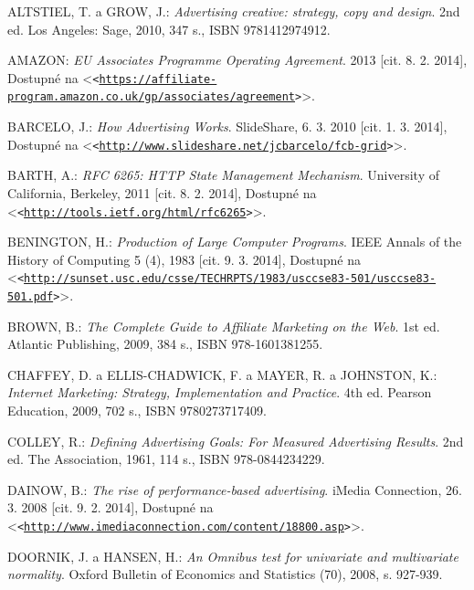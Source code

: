 \documentclass[12pt,twoside,openany]{fithesis}
\let\origurl\url
\def\url#1{\texttt{<\origurl{#1}>}}
\begin{document}

\begin{thebibliography}{99}



ALTSTIEL, T. a GROW, J.: \emph{Advertising creative: strategy, copy and design}. 2nd ed. Los Angeles: Sage, 2010, 347 s., ISBN 9781412974912.

AMAZON: \emph{EU Associates Programme Operating Agreement}. 2013 [cit. 8. 2. 2014], Dostupné na {\textless}\url{https://affiliate-program.amazon.co.uk/gp/associates/agreement}{\textgreater}.

BARCELO, J.: \emph{How Advertising Works}. SlideShare, 6. 3. 2010 [cit. 1. 3. 2014], Dostupné na {\textless}\url{http://www.slideshare.net/jcbarcelo/fcb-grid}{\textgreater}.

BARTH, A.: \emph{RFC 6265: HTTP State Management Mechanism}. University of California, Berkeley, 2011 [cit. 8. 2. 2014], Dostupné na {\textless}\url{http://tools.ietf.org/html/rfc6265}{\textgreater}.

BENINGTON, H.: \emph{Production of Large Computer Programs}. IEEE Annals of the History of Computing 5
        (4), 1983 [cit. 9. 3. 2014], Dostupné na {\textless}\url{http://sunset.usc.edu/csse/TECHRPTS/1983/usccse83-501/usccse83-501.pdf}{\textgreater}.

BROWN, B.: \emph{The Complete Guide to Affiliate Marketing on the Web}. 1st ed. Atlantic Publishing, 2009, 384 s., ISBN 978-1601381255.

CHAFFEY, D. a ELLIS-CHADWICK, F. a MAYER, R. a JOHNSTON, K.: \emph{Internet Marketing: Strategy, Implementation and Practice}. 4th ed. Pearson Education, 2009, 702 s., ISBN 9780273717409.

COLLEY, R.: \emph{Defining Advertising Goals: For Measured Advertising Results}. 2nd ed. The Association, 1961, 114 s., ISBN 978-0844234229.

DAINOW, B.: \emph{The rise of performance-based advertising}. iMedia Connection, 26. 3. 2008 [cit. 9. 2. 2014], Dostupné na {\textless}\url{http://www.imediaconnection.com/content/18800.asp}{\textgreater}.

DOORNIK, J. a HANSEN, H.: \emph{An Omnibus test for univariate and multivariate normality}.
Oxford Bulletin of Economics and Statistics (70), 2008, s. 927-939.


\end{thebibliography}
\end{document}
